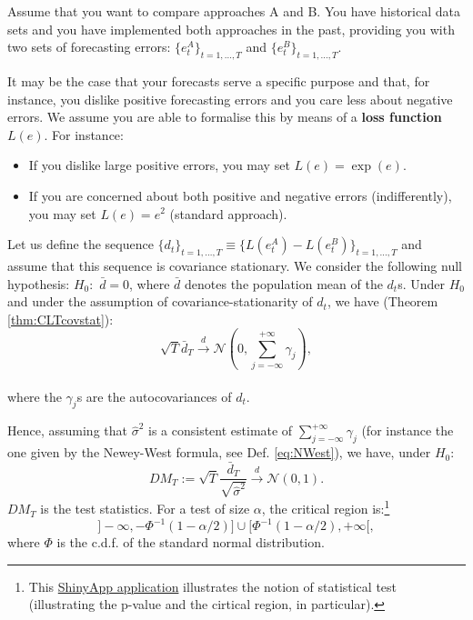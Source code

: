 \documentclass[
  11pt,
]{book}
\providecommand{\tightlist}{%
  \setlength{\itemsep}{0pt}\setlength{\parskip}{0pt}}
\theoremstyle{definition}
\theoremstyle{definition}
\theoremstyle{definition}
\theoremstyle{definition}
\theoremstyle{remark}
\begin{document}
Assume that you want to compare approaches A and B. You have historical data sets and you have implemented both approaches in the past, providing you with two sets of forecasting errors: \(\{e^{A}_t\}_{t=1,\dots,T}\) and \(\{e^{B}_t\}_{t=1,\dots,T}\).

It may be the case that your forecasts serve a specific purpose and that, for instance, you dislike positive forecasting errors and you care less about negative errors. We assume you are able to formalise this by means of a \textbf{loss function \(L(e)\)}. For instance:

\begin{itemize}
\tightlist
\item
  If you dislike large positive errors, you may set \(L(e)=\exp(e)\).
\item
  If you are concerned about both positive and negative errors (indifferently), you may set \(L(e)=e^2\) (standard approach).
\end{itemize}

Let us define the sequence \(\{d_t\}_{t=1,\dots,T} \equiv \{L(e^{A}_t)-L(e^{B}_t)\}_{t=1,\dots,T}\) and assume that this sequence is covariance stationary. We consider the following null hypothesis: \(H_0:\) \(\bar{d}=0\), where \(\bar{d}\) denotes the population mean of the \(d_t\)s. Under \(H_0\) and under the assumption of covariance-stationarity of \(d_t\), we have (Theorem \ref{thm:CLTcovstat}):
\[
\sqrt{T} \bar{d}_T \overset{d}{\rightarrow} \mathcal{N}\left(0,\sum_{j=-\infty}^{+\infty} \gamma_j \right),
\]\\
where the \(\gamma_j\)s are the autocovariances of \(d_t\).

Hence, assuming that \(\hat{\sigma}^2\) is a consistent estimate of \(\sum_{j=-\infty}^{+\infty} \gamma_j\) (for instance the one given by the Newey-West formula, see Def. \eqref{eq:NWest}), we have, under \(H_0\):
\[
DM_T := \sqrt{T}\frac{\bar{d}_T}{\sqrt{\hat{\sigma}^2}} \overset{d}{\rightarrow}  \mathcal{N}(0,1).
\]
\(DM_T\) is the test statistics. For a test of size \(\alpha\), the critical region is:\footnote{This \href{https://jrenne.shinyapps.io/tests/}{ShinyApp application} illustrates the notion of statistical test (illustrating the p-value and the cirtical region, in particular).}
\[
]-\infty,-\Phi^{-1}(1-\alpha/2)] \cup [\Phi^{-1}(1-\alpha/2),+\infty[,
\]
where \(\Phi\) is the c.d.f. of the standard normal distribution.
\end{document}
